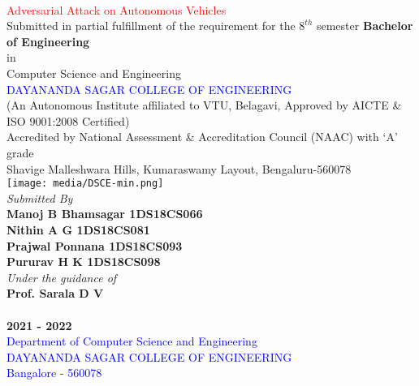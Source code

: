 \documentclass[ 12pt,a4paper,twocolumn,fleqn]{article}
\begin{document}
\onecolumn
\begin{center}
 \\
\smallskip
\textcolor{red}{\LARGE{Adversarial Attack on Autonomous Vehicles}} \\
\large{Submitted in partial fulfillment of the requirement for the $8^{th}$ semester}
\large{\textbf{Bachelor of Engineering}} \\
\large{in} \\
\large{Computer Science and Engineering} \\
\textcolor{blue}{\LARGE{DAYANANDA SAGAR COLLEGE OF ENGINEERING}} \\
\footnotesize{(An Autonomous Institute affiliated to VTU, Belagavi, Approved by AICTE \& ISO 9001:2008 Certified)} \\
\footnotesize{Accredited by National Assessment \& Accreditation Council (NAAC) with ‘A’ grade}  \\
\footnotesize{Shavige Malleshwara Hills, Kumaraswamy Layout, Bengaluru-560078} \\
\texttt{[image: media/DSCE-min.png]} \\
\textit{Submitted By} \\
\textbf{Manoj B Bhamsagar \space 1DS18CS066} \\
\textbf{Nithin A G \space 1DS18CS081} \\
\textbf{Prajwal Ponnana \space 1DS18CS093} \\
\textbf{Pururav H K \space 1DS18CS098} \\
\textit{Under the guidance of} \\
\textbf{Prof. Sarala D V}\\
\\
\Large{\textbf{2021 - 2022}} \\
\textcolor{blue}{\Large{Department of Computer Science and Engineering}} \\
\textcolor{blue}{\Large{DAYANANDA SAGAR COLLEGE OF ENGINEERING}} \\
\textcolor{blue}{\Large{Bangalore - 560078}} \\
\end{center}
\newpage
   \pagestyle{fancy}
   \thispagestyle{empty}
\thisfancypage{%
  \setlength{\fboxsep}{20pt}\doublebox}{}
\end{document}
